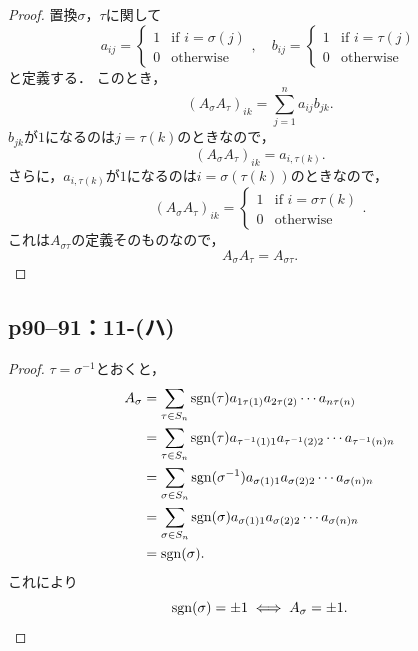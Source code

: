 \documentclass[a4paper,10pt,fleqn]{ltjsarticle}
\begin{document}
\begin{tleftbar}
  \begin{proof}
    置換$\sigma$，$\tau$に関して
    \[
      a_{ij} =
      \begin{cases}
        1 & \text{if } i = \sigma(j) \\
        0 & \text{otherwise}
      \end{cases},
      \quad
      b_{ij}=
      \begin{cases}
        1 & \text{if } i = \tau(j) \\
        0 & \text{otherwise}
      \end{cases}
    \]
    と定義する．
    このとき，
    \[
      (A_\sigma A_\tau)_{ik} = \sum_{j=1}^n a_{ij} b_{jk}.
    \]
    $b_{jk}$が$1$になるのは$j= \tau(k)$のときなので，
    \[
      (A_\sigma A_\tau)_{ik} = a_{i, \tau(k)}.
    \]
    さらに，$a_{i, \tau(k)}$が$1$になるのは$i = \sigma(\tau(k))$のときなので，
    \[
      (A_\sigma A_\tau)_{ik} =
      \begin{cases}
        1 & \text{if } i=\sigma \tau(k) \\
        0 & \text{otherwise}
      \end{cases}.
    \]
    これは$A_{\sigma \tau}$の定義そのものなので，
    \[
      A_\sigma A_\tau = A_{\sigma \tau}.
    \]
  \end{proof}
\end{tleftbar}


\subsection*{p90--91：11-(ハ)}

\begin{tleftbar}
  \begin{proof}
    $ \tau = \sigma^{-1}$とおくと，
    \begin{align*}
      A_\sigma & = \sum_{ \tau \in S_n} \operatorname{sgn}  (\tau) a_{1 \tau(1)} a_{2 \tau(2)} \cdots a_{n \tau(n)}               \\
               & = \sum_{ \tau \in S_n} \operatorname{sgn}  (\tau) a_{\tau^{-1}(1)1} a_{\tau^{-1} (2)2} \cdots a_{\tau^{-1} (n)n} \\
               & = \sum_{\sigma \in S_n} \operatorname{sgn} (\sigma^{-1}) a_{\sigma(1)1} a_{\sigma(2)2} \cdots a_{\sigma(n)n}     \\
               & = \sum_{\sigma \in S_n} \operatorname{sgn} (\sigma) a_{\sigma(1)1} a_{\sigma(2)2} \cdots a_{\sigma(n)n}          \\
               & = \operatorname{sgn} (\sigma).
    \end{align*}
    これにより
    \[
      \operatorname{sgn} (\sigma) = \pm 1 \iff A_\sigma = \pm 1.
    \]
  \end{proof}
\end{tleftbar}
\newpage
\end{document}
